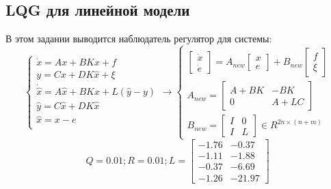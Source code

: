 \subsection{ LQG для линейной модели}
В этом задании выводится наблюдатель регулятор для системы:
\[
        \begin{cases}
                \dot{x} = A x + B  K \hat{x} + f \\
                y = Cx + DK\hat{x} + \xi \\
                \dot{\hat{x}} = A \hat{x} + B  K \hat{x} + L(\hat{y} - y) \\
                \hat{y} = C \hat{x} + D K \hat{x} \\
                \hat{x} = x - e \\
        \end{cases} \rightarrow
        \begin{cases}
            \begin{bmatrix} 
                \dot{x} \\
                \dot{e}
            \end{bmatrix} = 
            A_{new}
            \begin{bmatrix} 
              x \\
              e
            \end{bmatrix} 
          + B_{new} 
          \begin{bmatrix} 
            f \\
            \xi
          \end{bmatrix} 
            \\
            A_{new} = 
            \begin{bmatrix} 
                A + BK & -BK\\
                0 & A + LC
            \end{bmatrix} \\
            B_{new} = 
            \begin{bmatrix} 
                I & 0\\
                I & L
            \end{bmatrix} \in R^{2n \times (n + m)}
         \end{cases}
\]
\[Q = 0.01; R = 0.01; L = \begin{bmatrix}
        -1.76 & -0.37\\
        -1.11 & -1.88\\
        -0.37 & -6.69\\
        -1.26 & -21.97
       \end{bmatrix}\]
